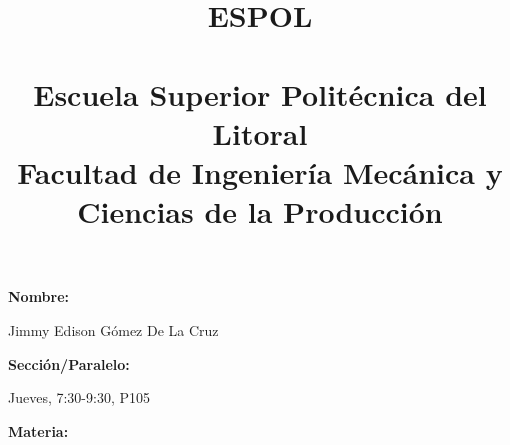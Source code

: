 \documentclass[a4paper,11pt]{article}
\begin{document}
\posttitle{\end{center}}
\title{\LARGE \textbf {ESPOL\\ \ \\Escuela Superior Polit\'ecnica del Litoral} \\ \mdseries Facultad de Ingenier\'ia Mec\'anica y \\Ciencias de la Producci\'on}
\date{}
\maketitle
\vspace{-2cm}
\hspace{2.5cm}\Large{\textbf {Nombre:}}
\begin{center}
Jimmy Edison Gómez De La Cruz
\end{center}
\hspace{2.8cm} \Large{ \textbf {Sección/Paralelo:}}
\begin{center}
Jueves, 7:30-9:30, P105
\end{center}
\hspace{3cm} \Large {\textbf {Materia:}}
\end{document}
